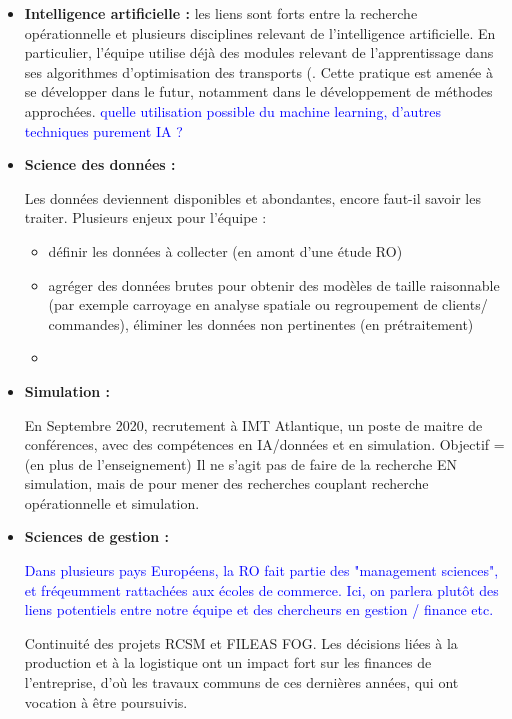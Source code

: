 	\begin{itemize}
	    \item \textbf{Intelligence artificielle :} les liens sont forts entre la recherche opérationnelle et plusieurs disciplines relevant de l'intelligence artificielle. En particulier, l'équipe utilise déjà des modules relevant de l'apprentissage dans ses algorithmes d'optimisation des transports (\textcolor{et ailleurs?}. Cette pratique est amenée à se développer dans le futur, notamment dans le développement de méthodes approchées. \textcolor{blue}{quelle utilisation possible du machine learning, d'autres techniques purement IA ? }
	    
	    
	    \item \textbf{Science des données : }
	    
	    Les données deviennent disponibles et abondantes, encore faut-il savoir les traiter. Plusieurs enjeux pour l'équipe \slp : 
	    \begin{itemize}
	        \item définir les données à collecter (en amont d'une étude RO)
	        \item agréger des données brutes pour obtenir des modèles de taille raisonnable (par exemple carroyage en analyse spatiale ou regroupement de clients/ commandes), éliminer les données non pertinentes (en prétraitement)
	        \item 
	    \end{itemize}
	    
	    \item \textbf{Simulation : }
	    
	    En Septembre 2020, recrutement à IMT Atlantique, un poste de maitre de conférences, avec des compétences en IA/données et en simulation. 
	    Objectif = (en plus de l'enseignement) Il ne s'agit pas de faire de la recherche EN simulation, mais de pour mener des recherches couplant recherche opérationnelle et simulation.
	    
	    
	    \item \textbf{Sciences de gestion : }
	    
	    \textcolor{blue}{Dans plusieurs pays Européens, la RO fait partie des "management sciences", et fréqeumment rattachées aux écoles de commerce. Ici, on parlera plutôt des liens potentiels entre notre équipe et des chercheurs en gestion / finance etc.}
	    
	    Continuité des projets RCSM et FILEAS FOG. Les décisions liées à la production et à la logistique ont un impact fort sur les finances de l'entreprise, d'où les travaux communs de ces dernières années, qui ont vocation à être poursuivis. 
	    

\end{itemize}
